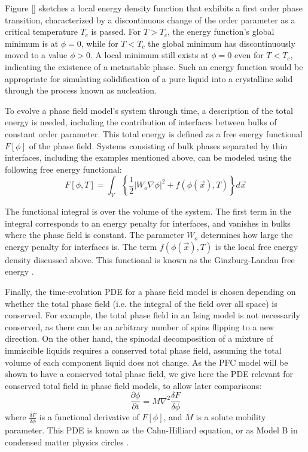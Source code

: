 \documentclass[a4paper]{article}
\begin{document}
Figure \ref{} sketches a local energy density function that exhibits a first order phase transition, characterized by a discontinuous change of the order parameter as a critical temperature $T_c$ is passed. For $T>T_c$, the energy function's global minimum is at $\phi=0$, while for $T<T_c$ the global minimum has discontinuously moved to a value $\phi>0$. A local minimum still exists at $\phi=0$ even for $T<T_c$, indicating the existence of a metastable phase. Such an energy function would be appropriate for simulating solidification of a pure liquid into a crystalline solid through the process known as nucleation.




To evolve a phase field model's system through time, a description of the total energy is needed, including the contribution of interfaces between bulks of constant order parameter. This total energy is defined as a free energy functional $F[\phi]$ of the phase field. Systems consisting of bulk phases separated by thin interfaces, including the examples mentioned above, can be modeled using the following free energy functional:
\begin{equation}\label{eq:ginzlandau}
F[\phi,T] = \int_V \left\{ \frac{1}{2} | W_o \nabla\phi |^2 + f(\phi(\vec{x}),T)  \right\}d\vec{x}
\end{equation}

The functional integral is over the volume of the system. The first term in the integral corresponds to an energy penalty for interfaces, and vanishes in bulks where the phase field is constant. The parameter $W_o$ determines how large the energy penalty for interfaces is. The term $f(\phi(\vec{x}),T)$ is the local free energy density discussed above. This functional is known as the Ginzburg-Landau free energy \cite{huang_statmech}.

Finally, the time-evolution PDE for a phase field model is chosen depending on whether the total phase field (i.e. the integral of the field over all space) is conserved. For example, the total phase field in an Ising model is not necessarily conserved, as there can be an arbitrary number of spins flipping to a new direction. On the other hand, the spinodal decomposition of a mixture of immiscible liquids requires a conserved total phase field, assuming the total volume of each component liquid does not change. As the PFC model will be shown to have a conserved total phase field, we give here the PDE relevant for conserved total field in phase field models, to allow later comparisons:
\begin{equation}\label{eq:modelB}
\frac{\partial\phi}{\partial t}=M\nabla^2\frac{\delta F}{\delta \phi}
\end{equation}
where $\frac{\delta F}{\delta \phi}$ is a functional derivative of $F[\phi]$, and $M$ is a solute mobility parameter. This PDE is known as the Cahn-Hilliard equation, or as Model B in condensed matter physics circles \cite{hohenberg77}.
\end{document}
